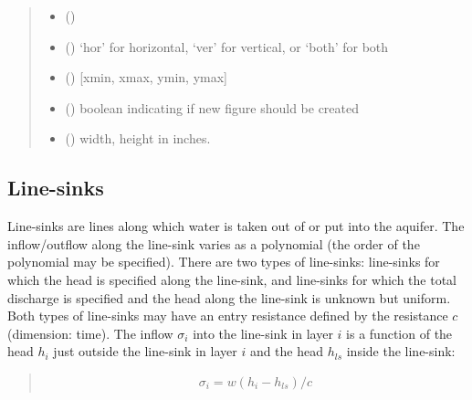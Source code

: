 \documentclass[letterpaper,10pt,english]{sphinxmanual}
\begin{document}
\begin{fulllineitems}
\begin{fulllineitems}
\begin{quote}
\begin{description}
\begin{itemize}
\item {} 
 () \textendash{} 

\item {} 
 () \textendash{} ‘hor’ for horizontal, ‘ver’ for vertical, or ‘both’ for both

\item {} 
 (\sphinxstyleliteralemphasis{ (}\sphinxstyleliteralemphasis{)}) \textendash{} {[}xmin, xmax, ymin, ymax{]}

\item {} 
 (\sphinxstyleliteralemphasis{ (}\sphinxstyleliteralemphasis{)}) \textendash{} boolean indicating if new figure should be created

\item {} 
 (\sphinxstyleliteralemphasis{, }\sphinxstyleliteralemphasis{, }) \textendash{} width, height in inches.

\end{itemize}

\end{description}\end{quote}

\end{fulllineitems}


\end{fulllineitems}



\subsection{Line-sinks}
\label{\detokenize{linesinks/linesinkindex:line-sinks}}\label{\detokenize{linesinks/linesinkindex::doc}}
Line-sinks are lines along which water is taken out of or put into the aquifer. The inflow/outflow along the line-sink varies as a polynomial (the order of the
polynomial may be specified).
There are two types of line-sinks: line-sinks for which the head is specified along the line-sink, and line-sinks for which the total discharge is specified
and the head along the line-sink is unknown but uniform.
Both types of line-sinks may have an entry resistance defined by the resistance \(c\) (dimension: time). The inflow \(\sigma_i\) into the line-sink in
layer \(i\) is a function of the head
\(h_i\) just outside the line-sink in layer \(i\) and the head \(h_{ls}\) inside the line-sink:
\begin{quote}
\begin{equation*}
\begin{split}\sigma_i = w(h_i - h_{ls})/c\end{split}
\end{equation*}\end{quote}
\end{document}
